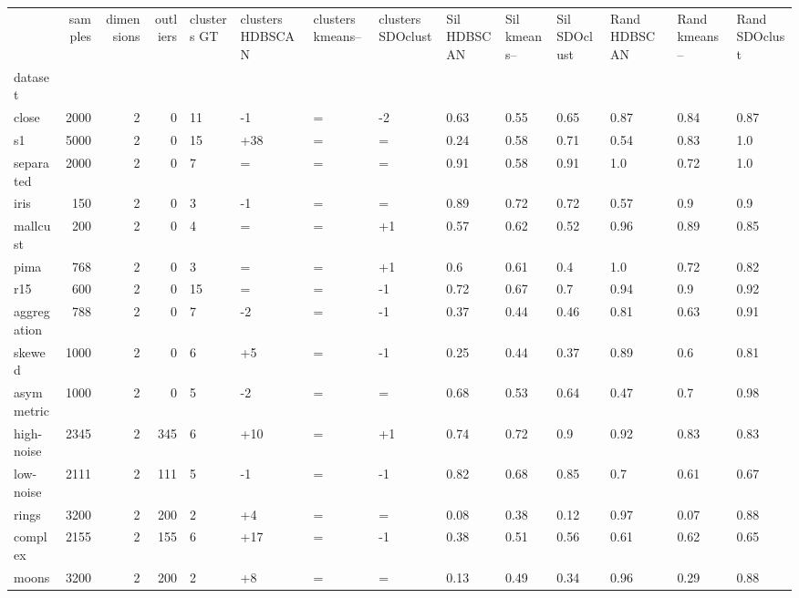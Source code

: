\begin{tabular}{lrrrllllllllll}
\toprule
 & samples & dimensions & outliers & clusters GT & clusters HDBSCAN & clusters kmeans-- & clusters SDOclust & Sil HDBSCAN & Sil kmeans-- & Sil SDOclust & Rand HDBSCAN & Rand kmeans-- & Rand SDOclust \\
dataset &  &  &  &  &  &  &  &  &  &  &  &  &  \\
\midrule
close & 2000 & 2 & 0 & 11 & -1 & = & -2 & 0.63 & 0.55 & 0.65 & 0.87 & 0.84 & 0.87 \\
s1 & 5000 & 2 & 0 & 15 & +38 & = & = & 0.24 & 0.58 & 0.71 & 0.54 & 0.83 & 1.0 \\
separated & 2000 & 2 & 0 & 7 & = & = & = & 0.91 & 0.58 & 0.91 & 1.0 & 0.72 & 1.0 \\
iris & 150 & 2 & 0 & 3 & -1 & = & = & 0.89 & 0.72 & 0.72 & 0.57 & 0.9 & 0.9 \\
mallcust & 200 & 2 & 0 & 4 & = & = & +1 & 0.57 & 0.62 & 0.52 & 0.96 & 0.89 & 0.85 \\
pima & 768 & 2 & 0 & 3 & = & = & +1 & 0.6 & 0.61 & 0.4 & 1.0 & 0.72 & 0.82 \\
r15 & 600 & 2 & 0 & 15 & = & = & -1 & 0.72 & 0.67 & 0.7 & 0.94 & 0.9 & 0.92 \\
aggregation & 788 & 2 & 0 & 7 & -2 & = & -1 & 0.37 & 0.44 & 0.46 & 0.81 & 0.63 & 0.91 \\
skewed & 1000 & 2 & 0 & 6 & +5 & = & -1 & 0.25 & 0.44 & 0.37 & 0.89 & 0.6 & 0.81 \\
asymmetric & 1000 & 2 & 0 & 5 & -2 & = & = & 0.68 & 0.53 & 0.64 & 0.47 & 0.7 & 0.98 \\
high-noise & 2345 & 2 & 345 & 6 & +10 & = & +1 & 0.74 & 0.72 & 0.9 & 0.92 & 0.83 & 0.83 \\
low-noise & 2111 & 2 & 111 & 5 & -1 & = & -1 & 0.82 & 0.68 & 0.85 & 0.7 & 0.61 & 0.67 \\
rings & 3200 & 2 & 200 & 2 & +4 & = & = & 0.08 & 0.38 & 0.12 & 0.97 & 0.07 & 0.88 \\
complex & 2155 & 2 & 155 & 6 & +17 & = & -1 & 0.38 & 0.51 & 0.56 & 0.61 & 0.62 & 0.65 \\
moons & 3200 & 2 & 200 & 2 & +8 & = & = & 0.13 & 0.49 & 0.34 & 0.96 & 0.29 & 0.88 \\
\bottomrule
\end{tabular}
